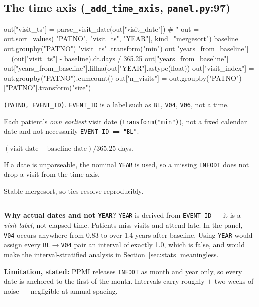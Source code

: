 \documentclass[11pt,a4paper]{article}
\newcommand{\code}[1]{\texttt{\small #1}}
\newcommand{\arr}{$\rightarrow$}
\newenvironment{keypoint}
  {\begin{center}\begin{minipage}{0.95\textwidth}%
   \vspace{4pt}\hrule\vspace{7pt}\small}
  {\vspace{7pt}\hrule\vspace{4pt}\end{minipage}\end{center}}
\begin{document}
\subsection{The time axis \quad (\code{\_add\_time\_axis}, \code{panel.py}:97)}

\begin{codeblock}
out["visit_ts"] = parse_visit_date(out["visit_date"])          # "%
out = out.sort_values(["PATNO", "visit_ts", "YEAR"], kind="mergesort")
baseline = out.groupby("PATNO")["visit_ts"].transform("min")
out["years_from_baseline"] = (out["visit_ts"] - baseline).dt.days / 365.25
out["years_from_baseline"] = out["years_from_baseline"].fillna(out["YEAR"].astype(float))
out["visit_index"] = out.groupby("PATNO").cumcount()
out["n_visits"]    = out.groupby("PATNO")["PATNO"].transform("size")
\end{codeblock}

\begin{description}[leftmargin=2.4cm,style=nextline]
  \item[Visit identity] \code{(PATNO, EVENT\_ID)}. \code{EVENT\_ID} is a label
    such as \code{BL}, \code{V04}, \code{V06}, not a time.
  \item[Baseline] Each patient's \emph{own earliest} visit date
    (\code{transform("min")}), not a fixed calendar date and not necessarily
    \code{EVENT\_ID == "BL"}.
  \item[Elapsed time] $(\text{visit date} - \text{baseline date})/365.25$ days.
  \item[Fallback] If a date is unparseable, the nominal \code{YEAR} is used, so
    a missing \code{INFODT} does not drop a visit from the time axis.
  \item[Sorting] Stable mergesort, so ties resolve reproducibly.
\end{description}

\begin{keypoint}
\textbf{Why actual dates and not \code{YEAR}?} \code{YEAR} is derived from
\code{EVENT\_ID} --- it is a \emph{visit label}, not elapsed time. Patients miss
visits and attend late. In the panel, \code{V04} occurs anywhere from 0.83 to
over 1.4 years after baseline. Using \code{YEAR} would assign every
\code{BL}\arr\code{V04} pair an interval of exactly 1.0, which is false, and
would make the interval-stratified analysis in Section~\ref{sec:stats}
meaningless.

\textbf{Limitation, stated:} PPMI releases \code{INFODT} as month and year only,
so every date is anchored to the first of the month. Intervals carry roughly
$\pm$ two weeks of noise --- negligible at annual spacing.
\end{keypoint}
\end{document}
